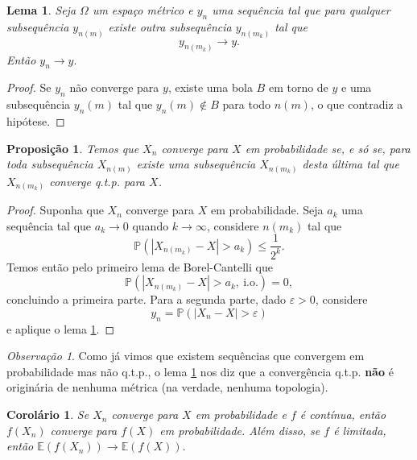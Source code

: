 \documentclass[12pt,a4paper,oneside]{book}
\newtheorem{proposition}[theorem]{Proposi\c{c}\~ao}
\newtheorem{corollary}[theorem]{Corol\'ario}
\newtheorem{lemma}[theorem]{Lema}
\theoremstyle{definition}
\theoremstyle{remark}
\newtheorem{remark}[theorem]{Observa\c{c}\~ao}
\numberwithin{equation}{section}
\newcommand{\e}{\varepsilon}
\newcommand{\E}{\mathbb{E}}
\newcommand{\pr}{\mathbb{P}}
\begin{document}
\begin{lemma}\label{lema-seq-subsub-conv}
Seja $\Omega$ um espaço métrico e  $y_n$ uma sequência tal que para qualquer subsequência $y_{n(m)}$ existe outra subsequência $y_{n(m_k)}$ tal que
$$y_{n(m_k)}\rightarrow y.$$
Então $y_n\rightarrow y.$
\end{lemma}

\begin{proof}
Se $y_n$ não converge para $y$, existe uma bola $B$ em torno de $y$ e uma subsequência $y_n(m)$ tal que $y_n(m)\not\in B$ para todo $n(m)$, o que contradiz a hipótese.
\end{proof}

\begin{proposition}\label{prop-convemprob<>subseqs}
Temos que $X_n$ converge para $X$ em probabilidade se, e só se, para toda subsequência $X_{n(m)}$ existe uma subsequência $X_{n(m_k)}$ desta última tal que $X_{n(m_k)}$ converge q.t.p. para $X$. 
\end{proposition}



\begin{proof}
Suponha que $X_n$ converge para $X$ em probabilidade. Seja $a_k$ uma sequência tal que $a_k \rightarrow 0$ quando $k\rightarrow \infty$, considere $n(m_k)$ tal que 
$$\pr(|X_{n(m_k)}-X|>a_k)\leq \dfrac{1}{2^k}. $$
Temos então pelo primeiro lema de Borel-Cantelli que 
$$\pr(|X_{n(m_k)}-X|>a_k,\ \textrm{i.o.}) = 0, $$
concluindo a primeira parte.
Para a segunda parte, dado $\e>0$, considere 
$$y_n = \pr(|X_n-X|>\e)$$
e aplique o lema \ref{lema-seq-subsub-conv}.
\end{proof}


\begin{tcolorbox}[colback = yellow!60]

\begin{remark}
Como já vimos que existem sequências que convergem em probabilidade mas não q.t.p., o lema \ref{lema-seq-subsub-conv} nos diz que a convergência q.t.p. \textbf{não} é originária de nenhuma métrica  (na verdade, nenhuma topologia).

\end{remark}

\end{tcolorbox}

\begin{corollary}
Se $X_n$ converge para $X$ em probabilidade e $f$ é contínua, então $f(X_n)$ converge para $f(X)$ em probabilidade. Além disso, se $f$ é limitada, então $\E(f(X_n))\rightarrow \E(f(X)).$
\end{corollary}
\end{document}
